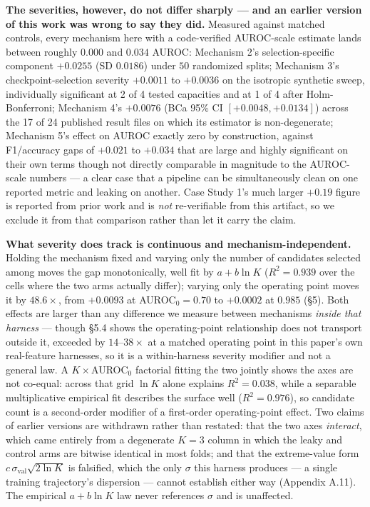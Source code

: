 \documentclass[10pt]{article} %
\begin{document}
\textbf{The severities, however, do not differ sharply --- and an earlier
version of this work was wrong to say they did.} Measured against matched
controls, every mechanism here with a code-verified AUROC-scale estimate lands
between roughly $0.000$ and $0.034$ AUROC: Mechanism 2's selection-specific
component $+0.0255$ (SD $0.0186$) under $50$ randomized splits; Mechanism 3's
checkpoint-selection severity $+0.0011$ to $+0.0036$ on the isotropic synthetic
sweep, individually significant at 2 of 4 tested capacities and at 1 of 4 after
Holm-Bonferroni; Mechanism 4's $+0.0076$ (BCa 95\% CI $[+0.0048,+0.0134]$)
across the 17 of 24 published result files on which its estimator is
non-degenerate; Mechanism 5's effect on AUROC exactly zero by construction,
against F1/accuracy gaps of $+0.021$ to $+0.034$ that are large and highly
significant on their own terms though not directly comparable in magnitude to
the AUROC-scale numbers --- a clear case that a pipeline can be simultaneously
clean on one reported metric and leaking on another. Case Study 1's much larger
$+0.19$ figure is reported from prior work and is \emph{not} re-verifiable from
this artifact, so we exclude it from that comparison rather than let it carry
the claim.

\textbf{What severity does track is continuous and mechanism-independent.}
Holding the mechanism fixed and varying only the number of candidates selected
among moves the gap monotonically, well fit by $a+b\ln K$ ($R^2=0.939$ over
the cells where the two arms actually differ);
varying only the operating point moves it by $48.6\times$, from $+0.0093$ at
AUROC$_0=0.70$ to $+0.0002$ at $0.985$ (§5). Both effects are larger than any
difference we measure between mechanisms \emph{inside that harness} --- though
§5.4 shows the operating-point relationship does not transport outside it,
exceeded by $14$--$38\times$ at a matched operating point in this paper's own
real-feature harnesses, so it is a within-harness severity modifier and not a
general law. A $K\times$AUROC$_0$ factorial fitting the two jointly shows the
axes are not co-equal: across that grid $\ln K$ alone explains $R^2=0.038$,
while a separable multiplicative empirical fit describes the surface well
($R^2=0.976$), so candidate count is a second-order modifier of a first-order
operating-point effect. Two claims of earlier versions are withdrawn rather
than restated: that the two axes \emph{interact}, which came entirely from a
degenerate $K=3$ column in which the leaky and control arms are bitwise
identical in most folds; and that the extreme-value form
$c\,\sigma_{\text{val}}\sqrt{2\ln K}$ is falsified, which the only $\sigma$
this harness produces --- a single training trajectory's dispersion --- cannot
establish either way (Appendix A.11). The empirical $a+b\ln K$ law never
references $\sigma$ and is unaffected.
\end{document}
